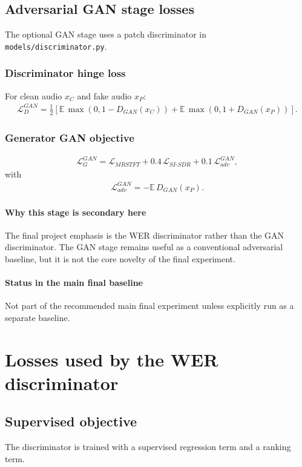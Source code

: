 \documentclass[11pt]{article}
\begin{document}
\subsection{Adversarial GAN stage losses}
The optional GAN stage uses a patch discriminator in \texttt{models/discriminator.py}.

\subsubsection{Discriminator hinge loss}
For clean audio $x_C$ and fake audio $x_P$:
\begin{align}
    \mathcal{L}_{D}^{GAN} = \frac{1}{2}\left[\mathbb{E}\,\max(0, 1 - D_{GAN}(x_C)) + \mathbb{E}\,\max(0, 1 + D_{GAN}(x_P))\right].
\end{align}

\subsubsection{Generator GAN objective}
\begin{align}
    \mathcal{L}_{G}^{GAN} = \mathcal{L}_{MRSTFT} + 0.4\,\mathcal{L}_{SI\text{-}SDR} + 0.1\,\mathcal{L}_{adv}^{GAN},
\end{align}
with
\begin{align}
    \mathcal{L}_{adv}^{GAN} = -\mathbb{E}\,D_{GAN}(x_P).
\end{align}

\paragraph{Why this stage is secondary here}
The final project emphasis is the WER discriminator rather than the GAN discriminator. The GAN stage remains useful as a conventional adversarial baseline, but it is not the core novelty of the final experiment.

\paragraph{Status in the main final baseline}
Not part of the recommended main final experiment unless explicitly run as a separate baseline.

\section{Losses used by the WER discriminator}

\subsection{Supervised objective}
The discriminator is trained with a supervised regression term and a ranking term.
\end{document}
